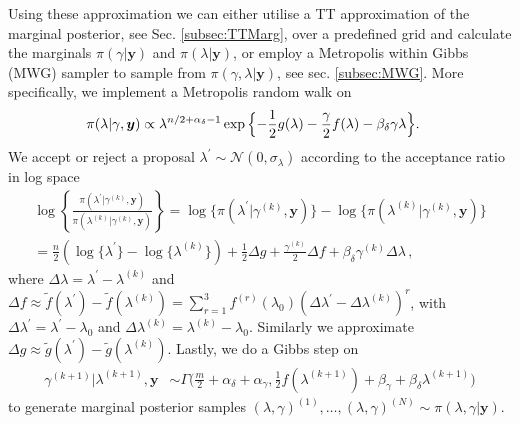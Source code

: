 Using these approximation we can either utilise a TT approximation of the marginal posterior, see Sec. \ref{subsec:TTMarg}, over a predefined grid and calculate the marginals $\pi(\gamma|\bm{y})$ and $\pi(\lambda|\bm{y})$, or employ a Metropolis within Gibbs (MWG) sampler to sample from $\pi(\gamma,\lambda|\bm{y})$, see sec. \ref{subsec:MWG}.
More specifically, we implement a Metropolis random walk on
\begin{align}
	\label{eq:margApplCondGam}
	\pi(\lambda | \gamma, \bm{y}) &\propto \lambda^{n/2+\alpha_\delta -1} \exp{\Bigl\{ - \frac{1}{2} g ( \lambda) - \frac{\gamma}{2} f ( \lambda) - \beta_\delta \gamma \lambda \Bigr\}}.
\end{align} 
We accept or reject a proposal $\lambda^{\prime} \sim \mathcal{N}(0, \sigma_{\lambda})$ according to the acceptance ratio in log space
\begin{align} 
	\log \left\{ \frac{\pi(\lambda^{\prime} | \gamma^{(k)}, \bm{y})  }{\pi(\lambda^{(k)}| \gamma^{(k)}, \bm{y})}  \right\} 
	= \log  \{\pi(\lambda^{\prime} | \gamma^{(k)}, \bm{y} ) \}  -\log  \{ \pi(\lambda^{(k)}| \gamma^{(k)}, \bm{y}) \} \\
	= \frac{n}{2} (\log\{\lambda^{\prime}\} - \log\{\lambda^{(k)}\} ) + \frac{1}{2} \Delta g + \frac{\gamma^{(k)}}{2} \Delta f  + \beta_\delta \gamma^{(k)} \Delta \lambda  \, ,
\end{align}
where $\Delta \lambda = \lambda^{\prime} - \lambda^{(k)} $ and  $\Delta f \approx \tilde{f}(\lambda^\prime) - \tilde{f}(\lambda^{(k)}) = \sum^3_{r = 1} f^{(r)} (\lambda_0) (\Delta \lambda^\prime - \Delta \lambda^{(k)})^r $, with  $\Delta \lambda^{\prime} = \lambda^\prime - \lambda_0 $ and $\Delta \lambda^{(k)} =  \lambda^{(k)} - \lambda_0$.
Similarly we approximate $\Delta g \approx \tilde{g}(\lambda^{\prime}) -\tilde{g}(\lambda^{(k)})$.
Lastly, we do a Gibbs step on
\begin{align}
	\gamma^{(k+1)} |  \lambda^{(k+1)}, \bm{y} &\sim \Gamma \bigg( \frac{m}{2} + \alpha_\delta + \alpha_\gamma, \frac{1}{2} f (\lambda^{(k+1)}) + \beta_\gamma + \beta_\delta \lambda^{(k+1)} \bigg)\label{eq:GibbsStep}
\end{align} 
to generate marginal posterior samples $(\lambda, \gamma)^{(1)}, \dots, (\lambda, \gamma)^{(N)} \sim  \pi(\lambda, \gamma| \bm{y})$.

